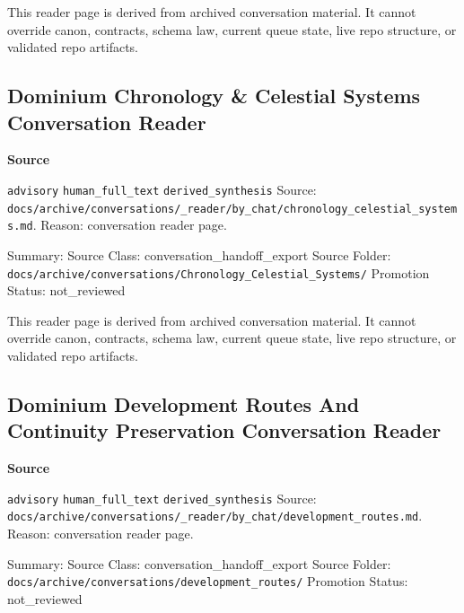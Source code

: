 \documentclass[9pt,a4paper,openany]{book}
\newcommand{\vonecallout}[3]{\par\medskip\noindent\begingroup\setlength{\fboxsep}{7pt}\colorbox{DomCalloutBg}{\parbox{0.94\linewidth}{\textbf{\textcolor{#1}{#2}}\par #3}}\endgroup\par\medskip}
\begin{document}
This reader page is derived from archived conversation material.\allowbreak{} It cannot override canon, contracts, schema law, current queue state, live repo structure, or validated repo artifacts.\allowbreak{}



\subsection{Dominium Chronology \& Celestial Systems Conversation Reader}

\vonecallout{DomSlate}{Source}{\texttt{advisory} \texttt{human\_\allowbreak{}full\_\allowbreak{}text} \texttt{derived\_\allowbreak{}synthesis} Source: \texttt{docs/\allowbreak{}archive/\allowbreak{}conversations/\allowbreak{}\_\allowbreak{}reader/\allowbreak{}by\_\allowbreak{}chat/\allowbreak{}chronology\_\allowbreak{}celestial\_\allowbreak{}systems.\allowbreak{}md}.\allowbreak{} Reason: conversation reader page.\allowbreak{}}

Summary: Source Class: conversation\_\allowbreak{}handoff\_\allowbreak{}export Source Folder: \texttt{docs/\allowbreak{}archive/\allowbreak{}conversations/\allowbreak{}Chronology\_\allowbreak{}Celestial\_\allowbreak{}Systems/\allowbreak{}} Promotion Status: not\_\allowbreak{}reviewed


This reader page is derived from archived conversation material.\allowbreak{} It cannot override canon, contracts, schema law, current queue state, live repo structure, or validated repo artifacts.\allowbreak{}



\subsection{Dominium Development Routes And Continuity Preservation Conversation Reader}

\vonecallout{DomSlate}{Source}{\texttt{advisory} \texttt{human\_\allowbreak{}full\_\allowbreak{}text} \texttt{derived\_\allowbreak{}synthesis} Source: \texttt{docs/\allowbreak{}archive/\allowbreak{}conversations/\allowbreak{}\_\allowbreak{}reader/\allowbreak{}by\_\allowbreak{}chat/\allowbreak{}development\_\allowbreak{}routes.\allowbreak{}md}.\allowbreak{} Reason: conversation reader page.\allowbreak{}}

Summary: Source Class: conversation\_\allowbreak{}handoff\_\allowbreak{}export Source Folder: \texttt{docs/\allowbreak{}archive/\allowbreak{}conversations/\allowbreak{}development\_\allowbreak{}routes/\allowbreak{}} Promotion Status: not\_\allowbreak{}reviewed
\end{document}
